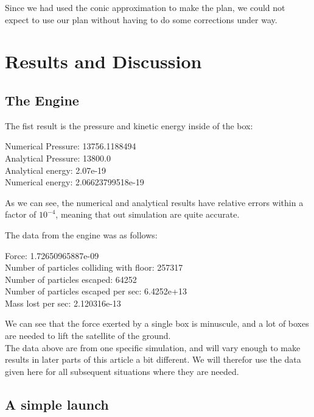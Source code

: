 \documentclass[a4paper, 10pt]{article}
\begin{document}
Since we had used the conic approximation to make the plan, we could not expect to use our plan without having to do some corrections under way. 




\section{Results and Discussion}

\subsection{The Engine}

The fist result is the pressure and kinetic energy inside of the box:
\begin{tcolorbox}
Numerical Pressure:  13756.1188494 \\
Analytical Pressure:  13800.0 \\
Analytical energy:  2.07e-19 \\
Numerical energy:  2.06623799518e-19 
\end{tcolorbox}

As we can see, the numerical and analytical results have relative errors within a factor of $10^{-4}$, meaning that out simulation are quite accurate.

The data from the engine was as follows:

\begin{tcolorbox}
Force:  1.72650965887e-09 \\
Number of particles colliding with floor:  257317 \\
Number of particles escaped:  64252 \\
Number of particles escaped per sec:  6.4252e+13 \\
Mass lost per sec:  2.120316e-13
\end{tcolorbox}

We can see that the force exerted by a single box is minuscule, and a lot of boxes are needed to lift the satellite of the ground. \\

The data above are from one specific simulation, and will vary enough to make results in later parts of this article a bit different. We will therefor use the data given here for all subsequent situations where they are needed.

\subsection{A simple launch}
\end{document}
